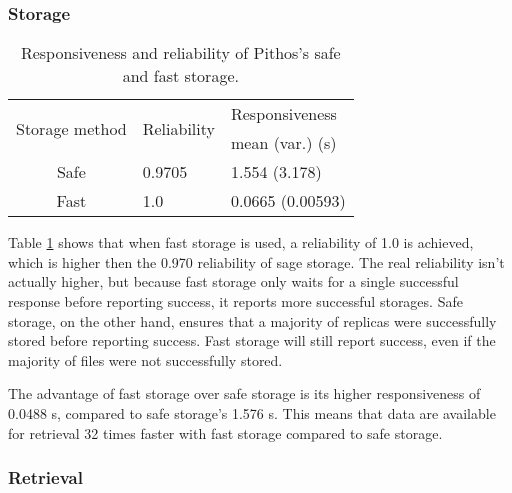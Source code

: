 \subsubsection{Storage}
\begin{table}[htbp]
\centering
\begin{tabular}{|c|l|l|}
\hline
\multirow{2}{*}{Storage method} & \multirow{2}{*}{Reliability} & Responsiveness \\
               &             & mean (var.) (s) \\
\hline
Safe    &  0.9705  &   1.554 (3.178)  \\
Fast    &  1.0     &   0.0665 (0.00593) \\
\hline
\end{tabular}
\caption{Responsiveness and reliability of Pithos's safe and fast storage.}
\label{tab_pithos_storage_results}
\end{table}
%
Table \ref{tab_pithos_storage_results} shows that when fast storage is used, a reliability of 1.0 is achieved, which is higher then the 0.970 reliability of sage storage. The real reliability isn't actually higher, but because fast storage only waits for a single successful response before reporting success, it reports more successful storages. Safe storage, on the other hand, ensures that a majority of replicas were successfully stored before reporting success. Fast storage will still report success, even if the majority of files were not successfully stored.

The advantage of fast storage over safe storage is its higher responsiveness of 0.0488 s, compared to safe storage's 1.576 s. This means that data are available for retrieval 32 times faster with fast storage compared to safe storage.

\subsubsection{Retrieval}

